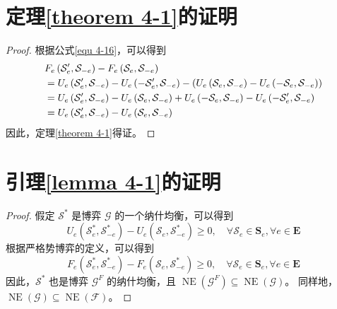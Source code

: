\section{定理\ref{theorem 4-1}的证明}
\label{appendix f}
\begin{proof} 根据公式\ref{equ 4-16}，可以得到
\begin{align}
&{F}_{e}\left(\mathcal{{S}}^{\prime}_{e}, \mathcal{S}_{-e}\right) - {F}_{e}\left(\mathcal{S}_{e}, \mathcal{S}_{-e}\right) \notag \\
		&={U}_{e}\left(\mathcal{S}^{\prime}_{e}, \mathcal{S}_{-e}\right) - {U}_{e}\left(-\mathcal{S}^{\prime}_{e}, \mathcal{S}_{-e}\right) - \left( {U}_{e}\left(\mathcal{S}_{e}, \mathcal{S}_{-e}\right) - {U}_{e}\left(-\mathcal{S}_{e}, \mathcal{S}_{-e}\right) \right) \notag \\
		&={U}_{e}\left(\mathcal{S}^{\prime}_{e}, \mathcal{S}_{-e}\right) - {U}_{e}\left(\mathcal{S}_{e}, \mathcal{S}_{-e}\right) + {U}_{e}\left(-\mathcal{S}_{e}, \mathcal{S}_{-e}\right) - {U}_{e}\left(-\mathcal{S}^{\prime}_{e}, \mathcal{S}_{-e}\right) \notag \\
		&={U}_{e}\left(\mathcal{S}^{\prime}_{e}, \mathcal{S}_{-e}\right) - {U}_{e}\left(\mathcal{S}_{e}, \mathcal{S}_{-e}\right)
\end{align}
因此，定理\ref{theorem 4-1}得证。
\end{proof}

\section{引理\ref{lemma 4-1}的证明}
\label{appendix g}
\begin{proof}
假定 $\mathcal{S}^{*}$ 是博弈 $\mathcal{G}$ 的一个纳什均衡，可以得到
\begin{equation}
	U_{e}\left(\mathcal{S}_{e}^{*}, \mathcal{S}_{-e}^{*}\right) - U_{e}\left(\mathcal{S}_{e}, \mathcal{S}_{-e}^{*}\right) \geq 0, \quad \forall \mathcal{S}_{e} \in \mathbf{S}_{e}, \forall e \in \mathbf{E}
\end{equation}
根据严格势博弈的定义，可以得到
\begin{equation}
	F_{e}\left(\mathcal{S}_{e}^{*}, \mathcal{S}_{-e}^{*}\right) - F_{e}\left(\mathcal{S}_{e}, \mathcal{S}_{-e}^{*}\right) \geq 0, \quad \forall \mathcal{S}_{e} \in \mathbf{S}_{e}, \forall e \in \mathbf{E}
\end{equation}
因此，$\mathcal{S}^{*}$ 也是博弈 $\mathcal{G}^{F}$ 的纳什均衡，且 $\operatorname{NE}(\mathcal{G}^{F}) \subseteq \operatorname{NE}(\mathcal{G})$。
同样地，$\operatorname{NE}(\mathcal{G}) \subseteq \operatorname{NE}(\mathcal{F})$。
\end{proof}

